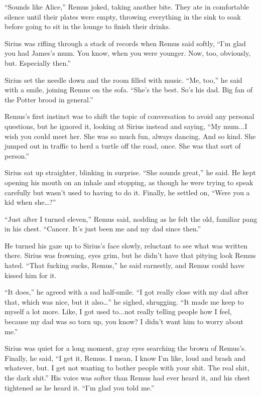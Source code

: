 “Sounds like Alice,” Remus joked, taking another bite. They ate in comfortable silence until their plates were empty, throwing everything in the sink to soak before going to sit in the lounge to finish their drinks.

Sirius was rifling through a stack of records when Remus said softly, “I’m glad you had James’s mum. You know, when you were younger. Now, too, obviously, but. Especially then.”

Sirius set the needle down and the room filled with music. “Me, too,” he said with a smile, joining Remus on the sofa. “She’s the best. So’s his dad. Big fan of the Potter brood in general.”

Remus’s first instinct was to shift the topic of conversation to avoid any personal questions, but he ignored it, looking at Sirius instead and saying, “My mum...I wish you could meet her. She was so much fun, always dancing. And so kind. She jumped out in traffic to herd a turtle off the road, once. She was that sort of person.”

Sirius sat up straighter, blinking in surprise. “She sounds great,” he said. He kept opening his mouth on an inhale and stopping, as though he were trying to speak carefully but wasn’t used to having to do it. Finally, he settled on, “Were you a kid when she…?”

“Just after I turned eleven,” Remus said, nodding as he felt the old, familiar pang in his chest. “Cancer. It’s just been me and my dad since then.”

He turned his gaze up to Sirius’s face slowly, reluctant to see what was written there. Sirius was frowning, eyes grim, but he didn’t have that pitying look Remus hated. “That fucking sucks, Remus,” he said earnestly, and Remus could have kissed him for it.

“It does,” he agreed with a sad half-smile. “I got really close with my dad after that, which was nice, but it also…” he sighed, shrugging. “It made me keep to myself a lot more. Like, I got used to...not really telling people how I feel, because my dad was so torn up, you know? I didn’t want him to worry about me.”

Sirius was quiet for a long moment, gray eyes searching the brown of Remus’s. Finally, he said, “I get it, Remus. I mean, I know I’m like, loud and brash and whatever, but. I get not wanting to bother people with your shit. The real shit, the dark shit.” His voice was softer than Remus had ever heard it, and his chest tightened as he heard it. “I’m glad you told me.”

